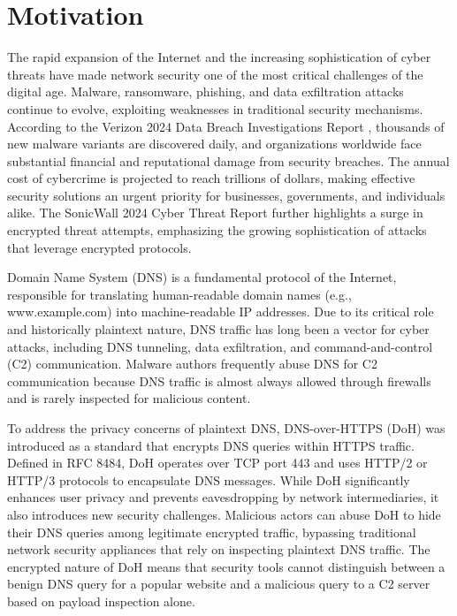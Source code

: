 \documentclass[../Main.tex]{subfiles}
\begin{document}
\section{Motivation}
\label{section:1.1}

The rapid expansion of the Internet and the increasing sophistication of cyber threats have made network security one of the most critical challenges of the digital age. Malware, ransomware, phishing, and data exfiltration attacks continue to evolve, exploiting weaknesses in traditional security mechanisms. According to the Verizon 2024 Data Breach Investigations Report \cite{verizon2024dbir}, thousands of new malware variants are discovered daily, and organizations worldwide face substantial financial and reputational damage from security breaches. The annual cost of cybercrime is projected to reach trillions of dollars, making effective security solutions an urgent priority for businesses, governments, and individuals alike. The SonicWall 2024 Cyber Threat Report \cite{sonicwall2024} further highlights a surge in encrypted threat attempts, emphasizing the growing sophistication of attacks that leverage encrypted protocols.

Domain Name System (DNS) is a fundamental protocol of the Internet, responsible for translating human-readable domain names (e.g., www.example.com) into machine-readable IP addresses. Due to its critical role and historically plaintext nature, DNS traffic has long been a vector for cyber attacks, including DNS tunneling, data exfiltration, and command-and-control (C2) communication. Malware authors frequently abuse DNS for C2 communication because DNS traffic is almost always allowed through firewalls and is rarely inspected for malicious content.

To address the privacy concerns of plaintext DNS, DNS-over-HTTPS (DoH) was introduced as a standard that encrypts DNS queries within HTTPS traffic. Defined in RFC 8484, DoH operates over TCP port 443 and uses HTTP/2 or HTTP/3 protocols to encapsulate DNS messages. While DoH significantly enhances user privacy and prevents eavesdropping by network intermediaries, it also introduces new security challenges. Malicious actors can abuse DoH to hide their DNS queries among legitimate encrypted traffic, bypassing traditional network security appliances that rely on inspecting plaintext DNS traffic. The encrypted nature of DoH means that security tools cannot distinguish between a benign DNS query for a popular website and a malicious query to a C2 server based on payload inspection alone.
\end{document}
